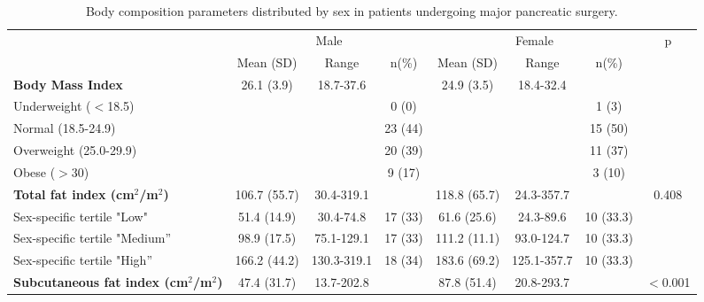\begin{sidewaystable}[p]
 \caption{Body composition parameters distributed by sex in patients undergoing major pancreatic surgery.}
 \label{table:bc_sex_specific_distrib}
 \renewcommand{\arraystretch}{1.2} %
 \centering
 \begin{tabular}{|l|c c c | c c c |c|}
 	\hline
 	                                                  &       \multicolumn{3}{c|}{Male}       &       \multicolumn{3}{c|}{Female}       & p        \\
 	                                                  &  Mean (SD)   & Range       & n(\%)   & Mean (SD)    & Range       & n(\%)     &  \\ \hline
 	\textbf{Body Mass Index}                          &  26.1 (3.9)  & 18.7-37.6   &         & 24.9 (3.5)   & 18.4-32.4   &           &  \\
 	Underweight ($<$18.5)                             &              &             & 0 (0)   &              &             & 1 (3)     &  \\
 	Normal (18.5-24.9)                                &              &             & 23 (44) &              &             & 15 (50)   &  \\
 	Overweight (25.0-29.9)                            &              &             & 20 (39) &              &             & 11 (37)   &  \\
 	Obese ($>$30)                                     &              &             & 9 (17)  &              &             & 3 (10)    &  \\ \hline
 	\textbf{Total fat index (cm$^2$/m$^2$)}           & 106.7 (55.7) & 30.4-319.1  &         & 118.8 (65.7) & 24.3-357.7  &           & 0.408    \\
 	Sex-specific tertile "Low"                        & 51.4 (14.9)  & 30.4-74.8   & 17 (33) & 61.6 (25.6)  & 24.3-89.6   & 10 (33.3) &  \\
 	Sex-specific tertile "Medium”                     & 98.9 (17.5)  & 75.1-129.1  & 17 (33) & 111.2 (11.1) & 93.0-124.7  & 10 (33.3) &  \\
 	Sex-specific tertile "High”                       & 166.2 (44.2) & 130.3-319.1 & 18 (34) & 183.6 (69.2) & 125.1-357.7 & 10 (33.3) &  \\ \hline
 	\textbf{Subcutaneous fat index (cm$^2$/m$^2$) }   & 47.4 (31.7)  & 13.7-202.8  &         & 87.8 (51.4)  & 20.8-293.7  &           & $<$0.001 \\

\end{tabular}
\end{sidewaystable}
